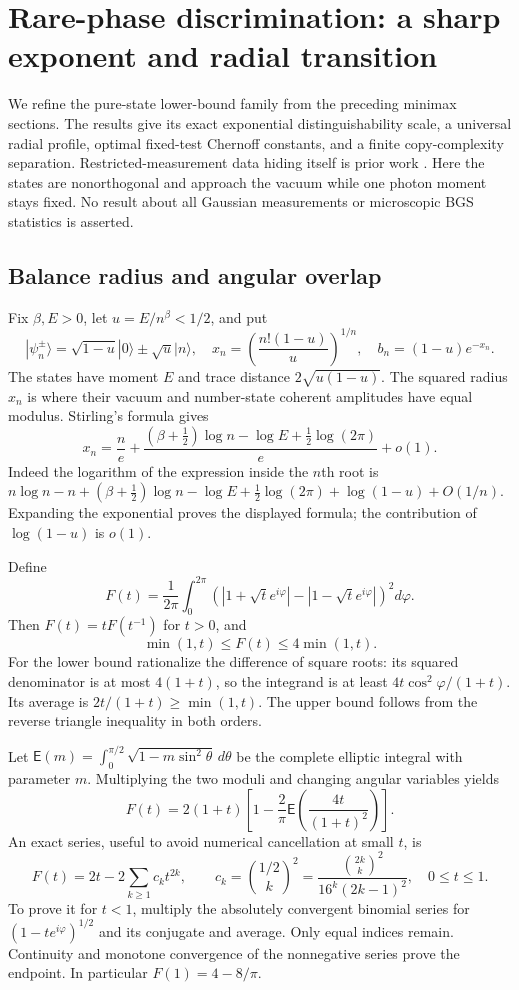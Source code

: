 \section{Rare-phase discrimination: a sharp exponent and radial transition}
\label{sec:rare-phase}
We refine the pure-state lower-bound family from the preceding minimax
sections. The results give its exact exponential distinguishability scale,
a universal radial profile, optimal fixed-test Chernoff constants, and a
finite copy-complexity separation. Restricted-measurement data hiding itself
is prior work \cite{Lami2021,SW2021}. Here the states are nonorthogonal and
approach the vacuum while one photon moment stays fixed. No result about
all Gaussian measurements or microscopic BGS statistics is asserted.

\subsection{Balance radius and angular overlap}
Fix $\beta,E>0$, let $u=E/n^\beta<1/2$, and put
\[
 |\psi_n^\pm\rangle=\sqrt{1-u}|0\rangle\pm\sqrt u|n\rangle,
 \quad x_n=\left(\frac{n!(1-u)}u\right)^{1/n},
 \quad b_n=(1-u)e^{-x_n}.
 \tag{C.1}\label{eq:rare-balance}
\]
The states have moment $E$ and trace distance $2\sqrt{u(1-u)}$.
The squared radius $x_n$ is where their vacuum and number-state coherent
amplitudes have equal modulus. Stirling's formula gives
\[
 x_n=\frac ne+
 \frac{(\beta+\tfrac12)\log n-\log E+\tfrac12\log(2\pi)}e+o(1).
 \tag{C.2}\label{eq:rare-radius}
\]
Indeed the logarithm of the expression inside the $n$th root is
$n\log n-n+(\beta+\tfrac12)\log n-\log E+
\tfrac12\log(2\pi)+\log(1-u)+O(1/n)$. Expanding the exponential proves
the displayed formula; the contribution of $\log(1-u)$ is $o(1)$.

Define
\[
 F(t)=\frac1{2\pi}\int_0^{2\pi}
 \left(\left|1+\sqrt t e^{i\varphi}\right|
           -\left|1-\sqrt t e^{i\varphi}\right|\right)^2d\varphi.
 \tag{C.3}\label{eq:rare-F}
\]
Then $F(t)=tF(t^{-1})$ for $t>0$, and
\[
 \min(1,t)\le F(t)\le4\min(1,t).
 \tag{C.4}\label{eq:rare-F-bounds}
\]
For the lower bound rationalize the difference of square roots: its squared
denominator is at most $4(1+t)$, so the integrand is at least
$4t\cos^2\varphi/(1+t)$. Its average is $2t/(1+t)\ge\min(1,t)$.
The upper bound follows from the reverse triangle inequality in both orders.

Let $\mathsf E(m)=\int_0^{\pi/2}\sqrt{1-m\sin^2\theta}\,d\theta$
be the complete elliptic integral with parameter $m$. Multiplying the two
moduli and changing angular variables yields
\[
 F(t)=2(1+t)\left[1-\frac2\pi\mathsf E\!\left(
                      \frac{4t}{(1+t)^2}\right)\right].
 \tag{C.5}\label{eq:rare-elliptic}
\]
An exact series, useful to avoid numerical cancellation at small $t$, is
\[
 F(t)=2t-2\sum_{k\ge1}c_kt^{2k},\qquad
 c_k=\binom{1/2}{k}^{\!2}
 =\frac{\binom{2k}{k}^2}{16^k(2k-1)^2},\quad 0\le t\le1.
 \tag{C.6}\label{eq:rare-series}
\]
To prove it for $t<1$, multiply the absolutely convergent binomial series for
$(1-te^{i\varphi})^{1/2}$ and its conjugate and average. Only equal indices
remain. Continuity and monotone convergence of the nonnegative series prove
the endpoint. In particular $F(1)=4-8/\pi$.

